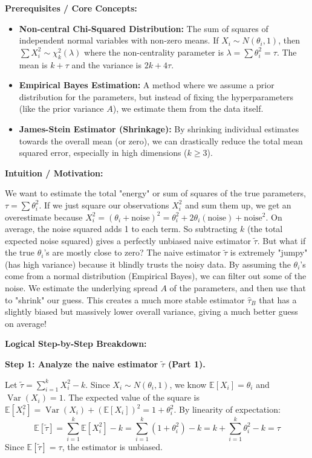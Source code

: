 \begin{solution}
\textbf{Prerequisites / Core Concepts:}
\begin{itemize}
    \item \textbf{Non-central Chi-Squared Distribution:} The sum of squares of independent normal variables with non-zero means. If $X_i \sim N(\theta_i, 1)$, then $\sum X_i^2 \sim \chi^2_k(\lambda)$ where the non-centrality parameter is $\lambda = \sum \theta_i^2 = \tau$. The mean is $k + \tau$ and the variance is $2k + 4\tau$.
    \item \textbf{Empirical Bayes Estimation:} A method where we assume a prior distribution for the parameters, but instead of fixing the hyperparameters (like the prior variance $A$), we estimate them from the data itself.
    \item \textbf{James-Stein Estimator (Shrinkage):} By shrinking individual estimates towards the overall mean (or zero), we can drastically reduce the total mean squared error, especially in high dimensions ($k \ge 3$).
\end{itemize}

\textbf{Intuition / Motivation:}

We want to estimate the total "energy" or sum of squares of the true parameters, $\tau = \sum \theta_i^2$. 
If we just square our observations $X_i^2$ and sum them up, we get an overestimate because $X_i^2 = (\theta_i + \text{noise})^2 = \theta_i^2 + 2\theta_i(\text{noise}) + \text{noise}^2$. On average, the noise squared adds 1 to each term. So subtracting $k$ (the total expected noise squared) gives a perfectly unbiased naive estimator $\tilde{\tau}$.
But what if the true $\theta_i$'s are mostly close to zero? The naive estimator $\tilde{\tau}$ is extremely "jumpy" (has high variance) because it blindly trusts the noisy data. 
By assuming the $\theta_i$'s come from a normal distribution (Empirical Bayes), we can filter out some of the noise. We estimate the underlying spread $A$ of the parameters, and then use that to "shrink" our guess. This creates a much more stable estimator $\hat{\tau}_B$ that has a slightly biased but massively lower overall variance, giving a much better guess on average!

\textbf{Logical Step-by-Step Breakdown:}

\textbf{Step 1: Analyze the naive estimator $\tilde{\tau}$ (Part 1).}

Let $\tilde{\tau} = \sum_{i=1}^k X_i^2 - k$.
Since $X_i \sim N(\theta_i, 1)$, we know $\mathbb{E}[X_i] = \theta_i$ and $\operatorname{Var}(X_i) = 1$.
The expected value of the square is $\mathbb{E}[X_i^2] = \operatorname{Var}(X_i) + (\mathbb{E}[X_i])^2 = 1 + \theta_i^2$.
By linearity of expectation:
\[ \mathbb{E}[\tilde{\tau}] = \sum_{i=1}^k \mathbb{E}[X_i^2] - k = \sum_{i=1}^k (1 + \theta_i^2) - k = k + \sum_{i=1}^k \theta_i^2 - k = \tau \]
Since $\mathbb{E}[\tilde{\tau}] = \tau$, the estimator is unbiased.


\end{solution}
